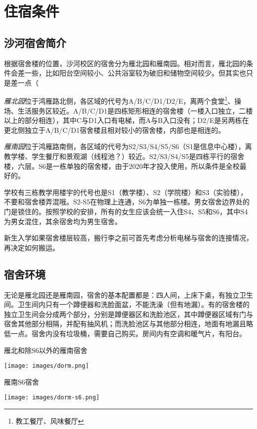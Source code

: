 \section{住宿条件}

\subsection{沙河宿舍简介}

根据宿舍楼的位置，沙河校区的宿舍分为雁北园和雁南园。相对而言，雁北园的条件会差一些，比如阳台空间较小、公共浴室较为破旧和储物空间较少。但其实也只是差一点（

\emph{雁北园}位于鸿雁路北侧，各区域的代号为A/B/C/D1/D2/E，离两个食堂\footnote{教工餐厅、风味餐厅}、操场、生活服务区较近。A/B/C/D1是四栋矩形相连的宿舍楼（一楼入口独立，二楼以上的部分相连），其中C与D1入口有电梯，而A与B入口没有；D2/E是另两栋在更北侧独立于A/B/C/D1宿舍楼且相对较小的宿舍楼，内部也是相连的。

\emph{雁南园}位于鸿雁路南侧，各区域的代号为S2/S3/S4/S5/S6（S1是信息中心楼），离教学楼、学生餐厅和景观湖（线程池？）较近。S2/S3/S4/S5是四栋平行的宿舍楼，六层。S6是一栋单独的宿舍楼，由于2020年才投入使用，所以条件是全校最好的。

学校有三栋教学用楼宇的代号也是S1（教学楼）、S2（学院楼）和S3（实验楼），不要和宿舍楼弄混哦。S2-S5在物理上连通，S6为单独一栋楼。男女宿舍边界处的门是锁住的。按照学校的安排，所有的女生应该会统一入住S4、S5和S6，其中S4为男女混住，其余宿舍均为男生宿舍。

新生入学如果宿舍楼层较高，搬行李之前可首先考虑分析电梯与宿舍的连接情况，再决定如何搬运。

\subsection{宿舍环境}

无论是雁北园还是雁南园，宿舍的基本配置都是：四人间，上床下桌，有独立卫生间。卫生间内只有一个蹲便器和洗脸面盆，不能洗澡（但有地漏）。有的宿舍楼的独立卫生间会分成两个部分，分别是蹲便器区和洗脸池区，其中蹲便器区域有门与宿舍其他部分相隔，并配有抽风机；而洗脸池区与其他部分相连，地面有地漏且略低一点。宿舍内没有垃圾桶，需要自己购买。房间内有空调和暖气片，有阳台。

\begin{center}
    \begin{minipage}{0.45\textwidth}
        \centerline{\sffamily\small 雁北和除S6以外的雁南宿舍}
        \centerline{\texttt{[image: images/dorm.png]}}
    \end{minipage}
    \qquad
    \begin{minipage}{0.45\textwidth}
        \centerline{\sffamily\small 雁南S6宿舍}
        \centerline{\texttt{[image: images/dorm-s6.png]}}
    \end{minipage}
\end{center}

